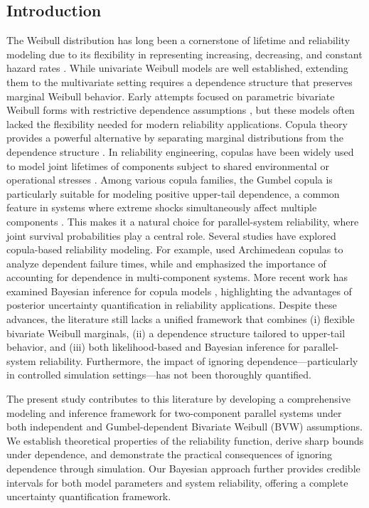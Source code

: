 \documentclass[twoside]{article}
\theoremstyle{plain}
\theoremstyle{definition}
\begin{document}
\subsection*{Introduction}
The Weibull distribution has long been a cornerstone of lifetime and reliability modeling due to its 
flexibility in representing increasing, decreasing, and constant hazard rates 
\citep{lawless2011statistical,meeker2021statistical}. 
While univariate Weibull models are well established, extending them to the multivariate setting 
requires a dependence structure that preserves marginal Weibull behavior. Early attempts focused on 
parametric bivariate Weibull forms with restrictive dependence assumptions 
\citep{kundu2009estimating}, but these models often lacked the flexibility needed 
for modern reliability applications.
Copula theory provides a powerful alternative by separating marginal distributions from the 
dependence structure \citep{Nelsen2006,joe2014dependence}. 
In reliability engineering, copulas have been widely used to model joint lifetimes of components 
subject to shared environmental or operational stresses 
\citep{bedford2001probabilistic}. 
Among various copula families, the Gumbel copula is particularly suitable for modeling positive 
upper-tail dependence, a common feature in systems where extreme shocks simultaneously affect 
multiple components \citep{embrechts2003modelling}. 
This makes it a natural choice for parallel-system reliability, where joint survival probabilities 
play a central role.
Several studies have explored copula-based reliability modeling. 
For example, \citet{kim2007copula} used Archimedean copulas to analyze dependent failure times, 
while \citet{barlow1996mathematical} and \citet{nelson2005applied} emphasized the importance of 
accounting for dependence in multi-component systems. 
More recent work has examined Bayesian inference for copula models 
\citep{smith2012estimation}, highlighting the advantages of posterior uncertainty 
quantification in reliability applications.
Despite these advances, the literature still lacks a unified framework that combines 
(i) flexible bivariate Weibull marginals,  
(ii) a dependence structure tailored to upper-tail behavior, and  
(iii) both likelihood-based and Bayesian inference for parallel-system reliability.  
Furthermore, the impact of ignoring dependence—particularly in controlled simulation settings—has 
not been thoroughly quantified.

The present study contributes to this literature by developing a comprehensive modeling and 
inference framework for two-component parallel systems under both independent and 
Gumbel-dependent Bivariate Weibull (BVW) assumptions. 
We establish theoretical properties of the reliability function, derive sharp bounds under 
dependence, and demonstrate the practical consequences of ignoring dependence through simulation. 
Our Bayesian approach further provides credible intervals for both model parameters and system 
reliability, offering a complete uncertainty quantification framework.
\end{document}
